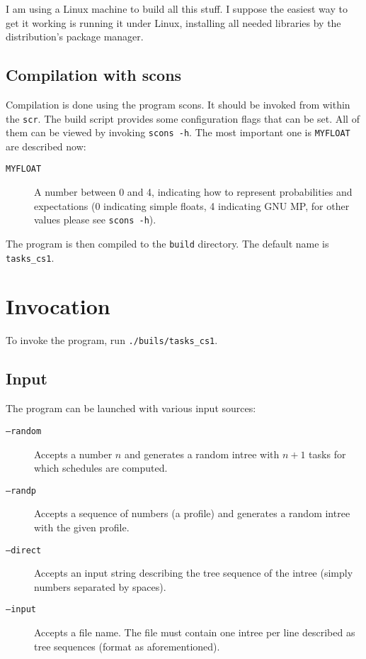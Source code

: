\documentclass[usletter]{article}
\newcommand{\dir}[1]{\texttt{#1}}
\begin{document}
I am using a Linux machine to build all this stuff. I suppose the easiest way to get it working is running it under Linux, installing all needed libraries by the distribution's package manager.

\subsection{Compilation with scons}

Compilation is done using the program scons. It should be invoked from within the \dir{scr}. The build script provides some configuration flags that can be set. All of them can be viewed by invoking \texttt{scons -h}. The most important one is \texttt{MYFLOAT} are described now:

\begin{description}
\item[\texttt{MYFLOAT}] A number between 0 and 4, indicating how to represent probabilities and expectations (0 indicating simple floats, 4 indicating GNU MP, for other values please see \texttt{scons -h}).
\end{description}

The program is then compiled to the \dir{build} directory. The default name is \texttt{tasks\_cs1}.

\section{Invocation}

To invoke the program, run \texttt{./buils/tasks\_cs1}.

\subsection{Input}

The program can be launched with various input sources:
\begin{description}
\item[\texttt{--random}] Accepts a number $n$ and generates a random intree with $n+1$ tasks for which schedules are computed.
\item[\texttt{--randp}] Accepts a sequence of numbers (a profile) and generates a random intree with the given profile.
\item[\texttt{--direct}] Accepts an input string describing the tree sequence of the intree (simply numbers separated by spaces).
\item[\texttt{--input}] Accepts a file name. The file must contain one intree per line described as tree sequences (format as aforementioned).
\end{description}
\end{document}
